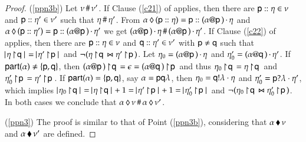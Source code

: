 \begin{proof}
(\ref{ppn3b}) Let $\nu\,\#\,\nu'$. If Clause (\ref{c21}) of
 applies, then there are
${\sf p}:: \eta\in \nu$ and ${\sf p}:: \eta'\in\nu'$
such that $\eta \,\#\, \eta'$.  From
${\alpha}\,\lozenge\,{({\sf p}:: \eta)}={\sf p}:: (\alpha @ {\sf p}\,)\,{\cdot}\,\eta$
and
${\alpha}\,\lozenge\,{({\sf p}:: \eta')}={\sf p}:: (\alpha @ {\sf p}\,)\,{\cdot}\,\eta'$
we get
$(\alpha @ {\sf p}\,)\,{\cdot}\,\eta\,\#\,(\alpha @ {\sf p}\,)\,{\cdot}\,\eta'$. If
Clause (\ref{c22}) of  applies, then there
are ${\sf p}:: \eta\in \nu$ and
${\sf q}:: \eta'\in\nu'$ with ${\sf p} \neq {\sf q}$ such that
$\cardin{\proj\procev\q} = \cardin{\proj{\procev'}\pp}$ and
$\neg(\eta \! \upharpoonright \! {\sf q}\,\Join \eta' \! \upharpoonright \! {\sf p}\,)$. Let
$\eta_0 =(\alpha @ {\sf p}\,)\,{\cdot}\,\eta$ and $\eta'_0
=(\alpha @ {\sf q}\,)\,{\cdot}\,\eta'$.  If
${\sf part}(\alpha)\neq\{{\sf p},{\sf q}\}$, then
$(\alpha @ {\sf p}\,) \! \upharpoonright \! {\sf q}\, = \epsilon =
(\alpha @ {\sf q}\,) \! \upharpoonright \! {\sf p}\,$ and thus
$\eta_0 \! \upharpoonright \! {\sf q}\,=\eta \! \upharpoonright \! {\sf q}\,$ and
$\eta'_0 \! \upharpoonright \! {\sf p}\,=\eta' \! \upharpoonright \! {\sf p}\,$. If
${\sf part}(\alpha)=\{{\sf p},{\sf q}\}$, say $\alpha={\sf p}{\sf q}\lambda$, then
$\eta_0={\sf q}!\lambda\cdot\eta$ and
$\eta'_0={\sf p}?\lambda\cdot\eta'$, which implies
$\cardin{\proj{\procev_0}\q} = \cardin{\proj{\procev}\q} +1 =
\cardin{\proj{\procev'}\pp} +1 = \cardin{\proj{\procev'_0}\pp}$ and
$\neg(\eta_0 \! \upharpoonright \! {\sf q}\,\Join \eta'_0 \! \upharpoonright \! {\sf p}\,)$.  In both
cases we conclude that ${\alpha}\,\lozenge\,{\nu}\,\#\,{\alpha}\,\lozenge\,{\nu'}$.

(\ref{ppn3}) The proof is similar to that of Point (\ref{ppn3b}),
considering that ${\alpha}\,\blacklozenge\,{\nu}$ and ${\alpha}\,\blacklozenge\,{\nu'}$
are defined.


\end{proof}
